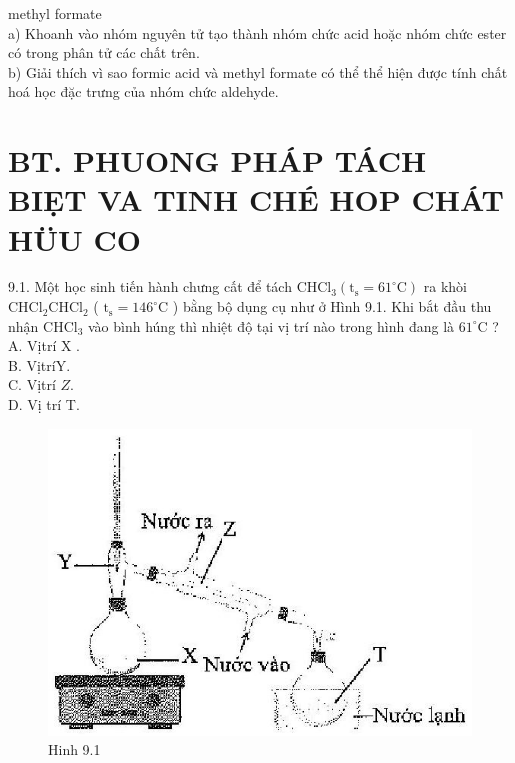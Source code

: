 \documentclass[10pt]{article}
\begin{document}
methyl formate\\
a) Khoanh vào nhóm nguyên tử tạo thành nhóm chức acid hoặc nhóm chức ester có trong phân tử các chất trên.\\
b) Giải thích vì sao formic acid và methyl formate có thể thể hiện được tính chất hoá học đặc trưng của nhóm chức aldehyde.

\section*{BT. PHUONG PHÁP TÁCH BIẸT VA TINH CHÉ HOP CHÁT HÜU CO}
9.1. Một học sinh tiến hành chưng cất để tách $\mathrm{CHCl}_{3}\left(\mathrm{t}_{\mathrm{s}}=61^{\circ} \mathrm{C}\right)$ ra khòi $\mathrm{CHCl}_{2} \mathrm{CHCl}_{2}$ ( $\mathrm{t}_{\mathrm{s}}=146^{\circ} \mathrm{C}$ ) bằng bộ dụng cụ như ở Hình 9.1. Khi bắt đầu thu nhận $\mathrm{CHCl}_{3}$ vào bình húng thì nhiệt độ tại vị trí nào trong hình đang là $61^{\circ} \mathrm{C}$ ?\\
A. Vịtrí X .\\
B. VịtríY.\\
C. Vịtrí $Z$.\\
D. Vị trí T.

\begin{figure}[h]
\begin{center}
  \includegraphics[width=\textwidth]{2025_10_23_f2823ef970776205e47bg-26}
\captionsetup{labelformat=empty}
\caption{Hinh 9.1}
\end{center}
\end{figure}
\end{document}
